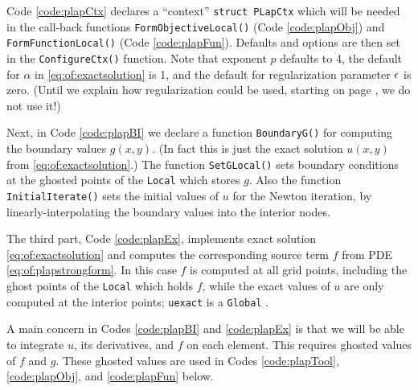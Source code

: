 
Code \ref{code:plapCtx} declares a ``context'' \texttt{struct PLapCtx} which will be needed in the call-back functions \texttt{FormObjectiveLocal()} (Code \ref{code:plapObj}) and \texttt{FormFunctionLocal()} (Code \ref{code:plapFun}).  Defaults and \PETSc options are then set in the \texttt{ConfigureCtx()} function.  Note that exponent $p$ defaults to 4, the default for $\alpha$ in \eqref{eq:of:exactsolution} is 1, and the default for regularization parameter $\epsilon$ is zero.  (Until we explain how regularization could be used, starting on page \pageref{page:of:condellip}, we do not use it!)


Next, in Code \ref{code:plapBI} we declare a function \texttt{BoundaryG()} for computing the boundary values $g(x,y)$.  (In fact this is just the exact solution $u(x,y)$ from \eqref{eq:of:exactsolution}.)  The function \texttt{SetGLocal()} sets boundary conditions at the ghosted points of the \texttt{Local} \pVec which stores $g$.  Also the function \texttt{InitialIterate()} sets the initial values of $u$ for the Newton iteration, by linearly-interpolating the boundary values into the interior nodes.

The third part, Code \ref{code:plapEx}, implements exact solution \eqref{eq:of:exactsolution} and computes the corresponding source term $f$ from PDE \eqref{eq:of:plapstrongform}.  In this case $f$ is computed at all grid points, including the ghost points of the \texttt{Local} \pVec which holds $f$, while the exact values of $u$ are only computed at the interior points; \texttt{uexact} is a \texttt{Global} \pVec.

A main concern in Codes \ref{code:plapBI} and \ref{code:plapEx} is that we will be able to integrate $u$, its derivatives, and $f$ on each element.  This requires ghosted values of $f$ and $g$.  These ghosted values are used in Codes \ref{code:plapTool}, \ref{code:plapObj}, and \ref{code:plapFun} below.


